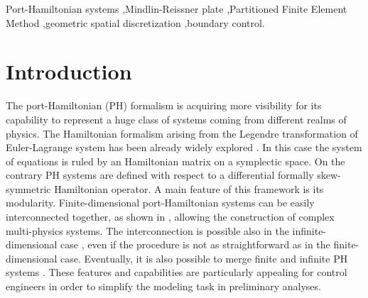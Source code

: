 \documentclass[preprint,12pt]{elsarticle}
\newcommand{\RevTwo}[1]{\textcolor{red!80!black}{#1}}
\begin{document}
\begin{frontmatter}
		\begin{keyword}
			Port-Hamiltonian systems \sep Mindlin-Reissner plate \sep Partitioned Finite Element Method \sep geometric spatial discretization \sep boundary control.		
		\end{keyword}
		
	\end{frontmatter}
	
	
	\section*{Introduction}
	 The port-Hamiltonian (PH) formalism is acquiring more visibility for its capability to represent a huge class of systems coming from different realms of physics. \RevTwo{The Hamiltonian formalism arising from the Legendre transformation of Euler-Lagrange system  has been already widely explored \cite{SymplecticElasticity}. In this case the system of equations is ruled by an Hamiltonian matrix on a symplectic space. On the contrary  PH systems are defined with respect to a differential formally skew-symmetric Hamiltonian operator.} A main feature of this framework is its modularity. Finite-dimensional port-Hamiltonian systems can be easily interconnected together, as shown in \cite{Cervera2007}, allowing the construction of complex multi-physics systems. The interconnection is possible also in the infinite-dimensional case \cite{ShaftIntInfinite}, even if the procedure is not as straightforward as in the finite-dimensional case. Eventually, it is also possible to merge finite and infinite PH systems \cite{vanderShaftintFinInf}. These features and capabilities are particularly appealing for control engineers in order to simplify the modeling task in preliminary analyses.  \\
	
\end{document}

